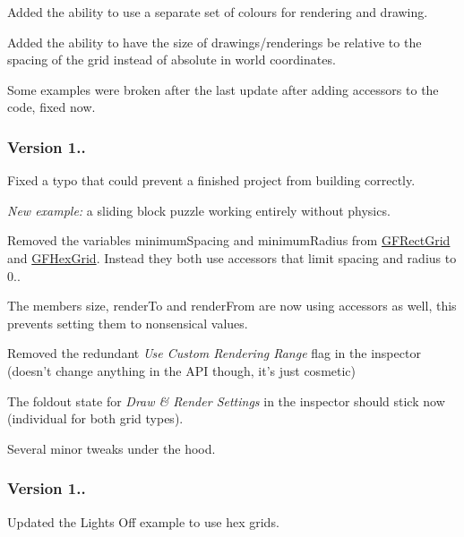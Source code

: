 \begin{DoxyItemize}
\item Added the ability to use a separate set of colours for rendering and drawing.
\item Added the ability to have the size of drawings/renderings be relative to the spacing of the grid instead of absolute in world coordinates.
\item Some examples were broken after the last update after adding accessors to the code, fixed now.
\end{DoxyItemize}

\subsubsection*{Version 1..}


\begin{DoxyItemize}
\item Fixed a typo that could prevent a finished project from building correctly.
\item {\itshape New example\+:} a sliding block puzzle working entirely without physics.
\item Removed the variables {\ttfamily minimum\+Spacing} and {\ttfamily minimum\+Radius} from {\ttfamily \hyperlink{class_g_f_rect_grid}{G\+F\+Rect\+Grid}} and {\ttfamily \hyperlink{class_g_f_hex_grid}{G\+F\+Hex\+Grid}}. Instead they both use accessors that limit spacing and radius to 0..
\item The members {\ttfamily size}, {\ttfamily render\+To} and {\ttfamily render\+From} are now using accessors as well, this prevents setting them to nonsensical values.
\item Removed the redundant {\itshape Use Custom Rendering Range} flag in the inspector (doesn't change anything in the A\+P\+I though, it's just cosmetic)
\item The foldout state for {\itshape Draw \& Render Settings} in the inspector should stick now (individual for both grid types).
\item Several minor tweaks under the hood.
\end{DoxyItemize}

\subsubsection*{Version 1..}


\begin{DoxyItemize}
\item Updated the Lights Off example to use hex grids.
\end{DoxyItemize}

